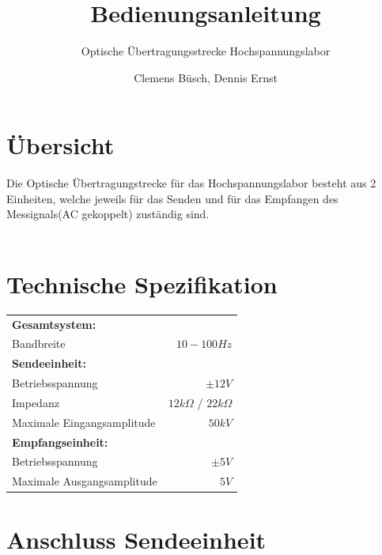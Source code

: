 \documentclass[10pt,a4paper]{scrartcl}
\begin{document}
\title{Bedienungsanleitung}
\author{Clemens Büsch, Dennis Ernst}
\date{}
\subtitle{Optische Übertragungsstrecke Hochspannungslabor}
\maketitle
\tableofcontents

\newpage
\section{Übersicht}
Die Optische Übertragungstrecke für das Hochspannungslabor besteht aus 2 Einheiten, welche jeweils für das Senden und für das Empfangen des Messignals(AC gekoppelt) zuständig sind.  \\ \\ 
[BILD SENDER UND EMPFÄNGER]

\section{Technische Spezifikation}
\begin{table}[h!]
\centering 
\begin{tabular}{@{} lr @{}}
 \toprule
 \textbf{Gesamtsystem:} \\
 Bandbreite & $10-100 Hz$ \\
  \midrule
  \textbf{Sendeeinheit:} \\
  Betriebsspannung & $\pm 12V$ \\
  Impedanz & $12k\Omega$ / $22k\Omega$   \\
  Maximale Eingangsamplitude & $50 kV$\\
  \midrule
  \textbf{Empfangseinheit:}\\
  Betriebsspannung & $\pm 5V$ \\
  Maximale Ausgangsamplitude &$ 5V$\\
  
 \bottomrule
\end{tabular}

\end{table}
\newpage

\section{Anschluss Sendeeinheit}
\end{document}

